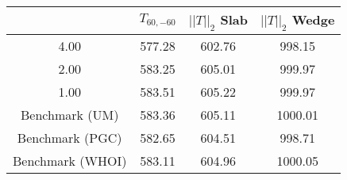 \begin{tabular}{c|ccc}
    & $T_{60,-60}$ & $||T||_2$ Slab & $||T||_2$ Wedge \\
\hline
4.00 & 577.28 & 602.76 & 998.15 \\
2.00 & 583.25 & 605.01 & 999.97 \\
1.00 & 583.51 & 605.22 & 999.97 \\
\hline
Benchmark (UM) & 583.36 & 605.11 & 1000.01 \\
Benchmark (PGC) & 582.65 & 604.51 & 998.71 \\
Benchmark (WHOI) & 583.11 & 604.96 & 1000.05 \\
\end{tabular}
